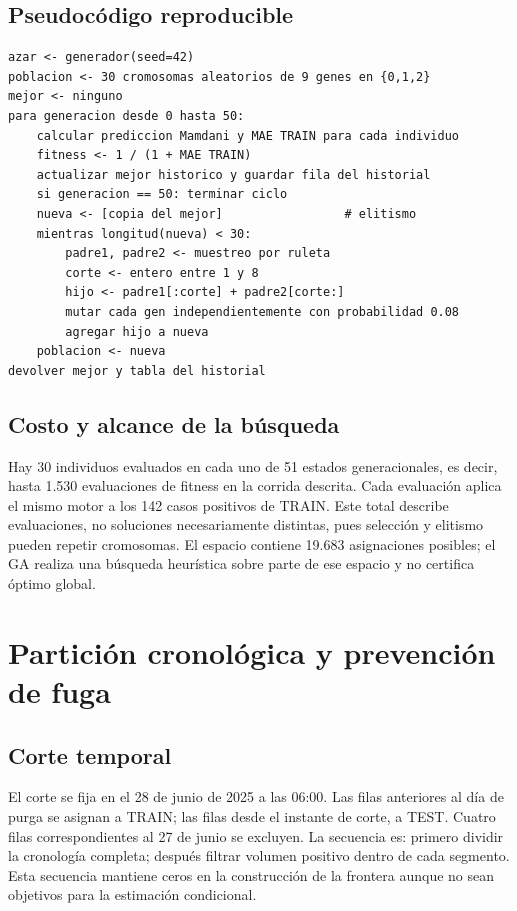 \documentclass[11pt,letterpaper]{article}
\begin{document}
\subsection{Pseudocódigo reproducible}
\begin{lstlisting}[caption={Esquema del algoritmo implementado},label={lst:pseudoga}]
azar <- generador(seed=42)
poblacion <- 30 cromosomas aleatorios de 9 genes en {0,1,2}
mejor <- ninguno
para generacion desde 0 hasta 50:
    calcular prediccion Mamdani y MAE TRAIN para cada individuo
    fitness <- 1 / (1 + MAE TRAIN)
    actualizar mejor historico y guardar fila del historial
    si generacion == 50: terminar ciclo
    nueva <- [copia del mejor]                 # elitismo
    mientras longitud(nueva) < 30:
        padre1, padre2 <- muestreo por ruleta
        corte <- entero entre 1 y 8
        hijo <- padre1[:corte] + padre2[corte:]
        mutar cada gen independientemente con probabilidad 0.08
        agregar hijo a nueva
    poblacion <- nueva
devolver mejor y tabla del historial
\end{lstlisting}

\subsection{Costo y alcance de la búsqueda}
Hay 30 individuos evaluados en cada uno de 51 estados generacionales, es decir, hasta 1.530 evaluaciones de fitness en la corrida descrita. Cada evaluación aplica el mismo motor a los 142 casos positivos de TRAIN. Este total describe evaluaciones, no soluciones necesariamente distintas, pues selección y elitismo pueden repetir cromosomas. El espacio contiene 19.683 asignaciones posibles; el GA realiza una búsqueda heurística sobre parte de ese espacio y no certifica óptimo global.

\section{Partición cronológica y prevención de fuga}
\subsection{Corte temporal}
El corte se fija en el 28 de junio de 2025 a las 06:00. Las filas anteriores al día de purga se asignan a TRAIN; las filas desde el instante de corte, a TEST. Cuatro filas correspondientes al 27 de junio se excluyen. La secuencia es: primero dividir la cronología completa; después filtrar volumen positivo dentro de cada segmento. Esta secuencia mantiene ceros en la construcción de la frontera aunque no sean objetivos para la estimación condicional.
\end{document}
